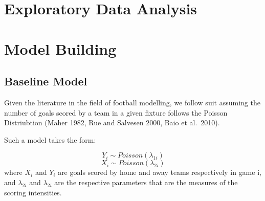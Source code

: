 \documentclass[
]{article}
\begin{document}
\hypertarget{exploratory-data-analysis}{%
\section{Exploratory Data Analysis}\label{exploratory-data-analysis}}

\hypertarget{section}{%
\subsection{}\label{section}}

\hypertarget{section-1}{%
\subsection{}\label{section-1}}

\hypertarget{section-2}{%
\subsection{}\label{section-2}}

\hypertarget{section-3}{%
\subsection{}\label{section-3}}

\hypertarget{section-4}{%
\subsection{}\label{section-4}}

\hypertarget{model-building}{%
\section{Model Building}\label{model-building}}

\hypertarget{baseline-model}{%
\subsection{Baseline Model}\label{baseline-model}}

Given the literature in the field of football modelling, we follow suit
assuming the number of goals scored by a team in a given fixture follows
the Poisson Distriubtion (Maher 1982, Rue and Salvesen 2000, Baio et
al.~2010).

Such a model takes the form:

\[Y_i \sim Poisson(\lambda_{1i}) \] \[X_i \sim Poisson(\lambda_{2i}) \]
where \(X_i\) and \(Y_i\) are goals scored by home and away teams
respectively in game i, and \(\lambda_{2i}\) and \(\lambda_{2i}\) are
the respective parameters that are the measures of the scoring
intensities.
\end{document}

